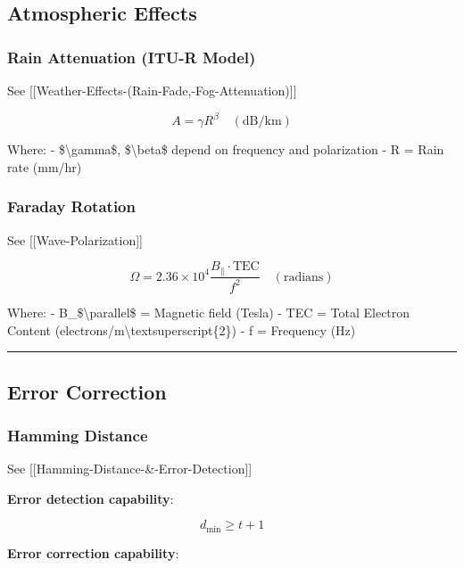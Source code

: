 \subsection{\texorpdfstring{ Atmospheric
Effects}{ Atmospheric Effects}}\label{atmospheric-effects}

\subsubsection{Rain Attenuation (ITU-R
Model)}\label{rain-attenuation-itu-r-model}

See {[}{[}Weather-Effects-(Rain-Fade,-Fog-Attenuation){]}{]}

\[
A = \gamma R^{\beta} \quad (\text{dB/km})
\]

Where: - \$\textbackslash gamma\$, \$\textbackslash beta\$ depend on
frequency and polarization - R = Rain rate (mm/hr)

\subsubsection{Faraday Rotation}\label{faraday-rotation}

See {[}{[}Wave-Polarization{]}{]}

\[
\Omega = 2.36 \times 10^4 \frac{B_\parallel \cdot \text{TEC}}{f^2} \quad (\text{radians})
\]

Where: - B\_\$\textbackslash parallel\$ = Magnetic field (Tesla) - TEC =
Total Electron Content (electrons/m\textbackslash textsuperscript\{2\})
- f = Frequency (Hz)

\begin{center}\rule{0.5\linewidth}{0.5pt}\end{center}

\subsection{\texorpdfstring{ Error
Correction}{ Error Correction}}\label{error-correction}

\subsubsection{Hamming Distance}\label{hamming-distance}

See {[}{[}Hamming-Distance-\&-Error-Detection{]}{]}

\textbf{Error detection capability}:

\[
d_{\min} \geq t + 1
\]

\textbf{Error correction capability}:

